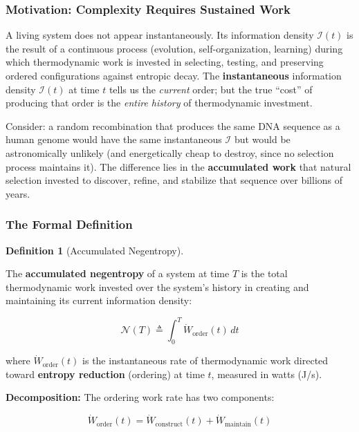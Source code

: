 \documentclass[11pt]{article}
\theoremstyle{plain}
\theoremstyle{definition}
\newtheorem{definition}{Definition}
\theoremstyle{remark}
\let\origsubsubsection\subsubsection
\renewcommand{\subsubsection}{\needspace{4\baselineskip}\origsubsubsection}
\begin{document}
\subsubsection{Motivation: Complexity Requires Sustained
Work}\label{motivation-complexity-requires-sustained-work}

A living system does not appear instantaneously. Its information density
\(\mathcal{I}(t)\) is the result of a continuous process (evolution,
self-organization, learning) during which thermodynamic work is invested
in selecting, testing, and preserving ordered configurations against
entropic decay. The \textbf{instantaneous} information density
\(\mathcal{I}(t)\) at time \(t\) tells us the \emph{current} order; but
the true ``cost'' of producing that order is the \emph{entire history}
of thermodynamic investment.

Consider: a random recombination that produces the same DNA sequence as
a human genome would have the same instantaneous \(\mathcal{I}\) but
would be astronomically unlikely (and energetically cheap to destroy,
since no selection process maintains it). The difference lies in the
\textbf{accumulated work} that natural selection invested to discover,
refine, and stabilize that sequence over billions of years.

\subsubsection{The Formal Definition}\label{the-formal-definition}

\begin{definition}[Accumulated Negentropy]
\label{def-accumulated-negentropy}

The \textbf{accumulated negentropy} of a system at time $T$ is the total thermodynamic work invested over the system's history in creating and maintaining its current information density:

$$\mathcal{N}(T) \triangleq \int_0^T \dot{W}_{\text{order}}(t) \, dt$$

where $\dot{W}_{\text{order}}(t)$ is the instantaneous rate of thermodynamic work directed toward \textbf{entropy reduction} (ordering) at time $t$, measured in watts (J/s).
\end{definition}

\textbf{Decomposition:} The ordering work rate has two components:

\[\dot{W}_{\text{order}}(t) = \dot{W}_{\text{construct}}(t) + \dot{W}_{\text{maintain}}(t)\]
\end{document}
